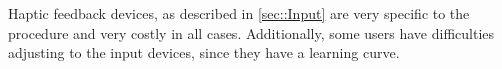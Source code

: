 Haptic feedback devices, as described in \ref{sec::Input} are very specific to the procedure and very costly in all cases.
Additionally, some users have difficulties adjusting to the input devices, since they have a learning curve.